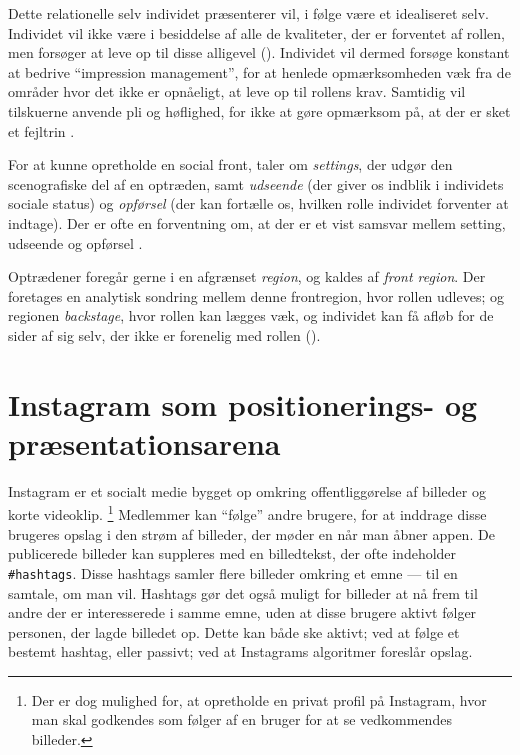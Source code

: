Dette relationelle selv individet præsenterer vil, i følge 
\citeauthor{goffmanPresentationSelfEveryday1956} være et 
idealiseret selv. Individet vil ikke være i besiddelse af alle de 
kvaliteter, der er forventet af rollen, men forsøger at leve op 
til disse alligevel (\citeyear[s.  
?]{goffmanPresentationSelfEveryday1956}). Individet vil dermed 
forsøge konstant at bedrive “impression management”, for at 
henlede opmærksomheden væk fra de områder hvor det ikke er 
opnåeligt, at leve op til rollens krav. Samtidig vil tilskuerne 
anvende pli og høflighed, for ikke at gøre opmærksom på, at der er 
sket et fejltrin \autocite[s.  
7-8]{goffmanPresentationSelfEveryday1956}.

For at kunne opretholde en social front, taler 
\citeauthor{goffmanPresentationSelfEveryday1956} om 
\emph{settings}, der udgør den scenografiske del af en optræden, 
samt \emph{udseende} (der giver os indblik i individets sociale 
status) og \emph{opførsel} (der kan fortælle os, hvilken rolle 
individet forventer at indtage).  Der er ofte en forventning om, 
at der er et vist samsvar mellem setting, udseende og opførsel 
\autocite[s. 14-15]{goffmanPresentationSelfEveryday1956}.

Optrædener foregår gerne i en afgrænset \emph{region}, og kaldes 
af \citeauthor{goffmanPresentationSelfEveryday1956} \emph{front
region}. Der foretages en analytisk sondring mellem  denne
frontregion, hvor rollen udleves; og regionen  \emph{backstage},
hvor rollen kan lægges væk, og individet kan få  afløb for de
sider af sig selv, der ikke er forenelig med rollen  (\citeyear[s.
69]{goffmanPresentationSelfEveryday1956}).

\section{Instagram som positionerings- og præsentationsarena}

Instagram er et socialt medie bygget op omkring offentliggørelse 
af billeder og korte videoklip. \footnote{Der er dog mulighed for,
at opretholde en privat profil på Instagram, hvor man skal 
godkendes som følger af en bruger for at se vedkommendes 
billeder.} Medlemmer kan “følge” andre brugere, for at inddrage 
disse brugeres opslag i den strøm af billeder, der møder en når 
man åbner appen. De publicerede billeder kan suppleres med en
billedtekst, der ofte indeholder 
\texttt{\#hashtags}.  Disse hashtags samler flere billeder omkring
et emne — til en samtale, om man vil. Hashtags gør det også muligt
for billeder at nå frem til andre der er interesserede i samme 
emne, uden at disse brugere aktivt følger personen, der lagde 
billedet op. Dette kan både ske aktivt; ved at følge et bestemt
hashtag, eller passivt; ved at Instagrams algoritmer foreslår
opslag.

